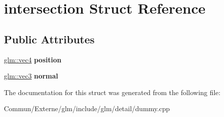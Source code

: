 \hypertarget{structintersection}{}\section{intersection Struct Reference}
\label{structintersection}
\subsection*{Public Attributes}
\begin{DoxyCompactItemize}
\item 
\hyperlink{group__core__types_ga5881b1b022d7fd1b7218f5916532dd02}{glm\+::vec4} {\bfseries position}\hypertarget{structintersection_a7a33f425d759e3e1240499a7f527b914}{}\label{structintersection_a7a33f425d759e3e1240499a7f527b914}

\item 
\hyperlink{group__core__types_ga1c47e8b3386109bc992b6c48e91b0be7}{glm\+::vec3} {\bfseries normal}\hypertarget{structintersection_a4db60aeaf032905a89ca8382914b44e4}{}\label{structintersection_a4db60aeaf032905a89ca8382914b44e4}

\end{DoxyCompactItemize}


The documentation for this struct was generated from the following file\+:\begin{DoxyCompactItemize}
\item 
Commun/\+Externe/glm/include/glm/detail/dummy.\+cpp\end{DoxyCompactItemize}

